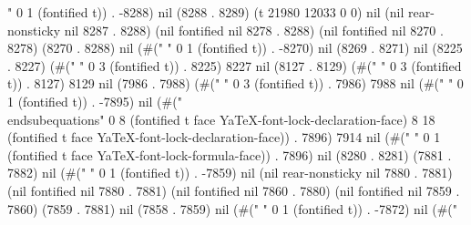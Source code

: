 " 0 1 (fontified t)) . -8288) nil (8288 . 8289) (t 21980 12033 0 0) nil (nil rear-nonsticky nil 8287 . 8288) (nil fontified nil 8278 . 8288) (nil fontified nil 8270 . 8278) (8270 . 8288) nil (#(" " 0 1 (fontified t)) . -8270) nil (8269 . 8271) nil (8225 . 8227) (#("   " 0 3 (fontified t)) . 8225) 8227 nil (8127 . 8129) (#("   " 0 3 (fontified t)) . 8127) 8129 nil (7986 . 7988) (#("   " 0 3 (fontified t)) . 7986) 7988 nil (#("
" 0 1 (fontified t)) . -7895) nil (#("\\end{subequations}" 0 8 (fontified t face YaTeX-font-lock-declaration-face) 8 18 (fontified t face YaTeX-font-lock-declaration-face)) . 7896) 7914 nil (#(" " 0 1 (fontified t face YaTeX-font-lock-formula-face)) . 7896) nil (8280 . 8281) (7881 . 7882) nil (#(" " 0 1 (fontified t)) . -7859) nil (nil rear-nonsticky nil 7880 . 7881) (nil fontified nil 7880 . 7881) (nil fontified nil 7860 . 7880) (nil fontified nil 7859 . 7860) (7859 . 7881) nil (7858 . 7859) nil (#("
" 0 1 (fontified t)) . -7872) nil (#("

